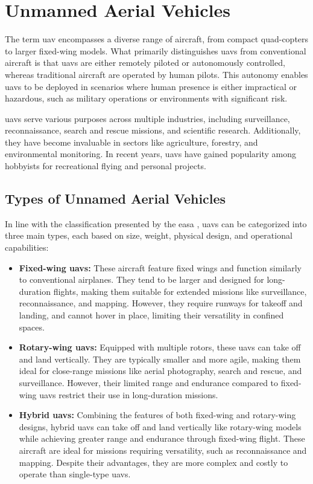 \chapter{Unmanned Aerial Vehicles}\label{ch:unmanned_aerial_vehicles}

The term \gls{uav} encompasses a diverse range of aircraft, from compact quad-copters to larger fixed-wing models. What primarily distinguishes \glspl{uav} from conventional aircraft is that \glspl{uav} are either remotely piloted or autonomously controlled, whereas traditional aircraft are operated by human pilots. This autonomy enables \glspl{uav} to be deployed in scenarios where human presence is either impractical or hazardous, such as military operations or environments with significant risk.

\glspl{uav} serve various purposes across multiple industries, including surveillance, reconnaissance, search and rescue missions, and scientific research. Additionally, they have become invaluable in sectors like agriculture, forestry, and environmental monitoring. In recent years, \glspl{uav} have gained popularity among hobbyists for recreational flying and personal projects.

\section{Types of Unnamed Aerial Vehicles}\label{sec:uav_types}

In line with the classification presented by the \gls{easa} \autocite{eu-947-2019}, \glspl{uav} can be categorized into three main types, each based on size, weight, physical design, and operational capabilities:

\begin{itemize}
  \item \textbf{Fixed-wing \glspl{uav}:} These aircraft feature fixed wings and function similarly to conventional airplanes. They tend to be larger and designed for long-duration flights, making them suitable for extended missions like surveillance, reconnaissance, and mapping. However, they require runways for takeoff and landing, and cannot hover in place, limiting their versatility in confined spaces.

  \item \textbf{Rotary-wing \glspl{uav}:} Equipped with multiple rotors, these \glspl{uav} can take off and land vertically. They are typically smaller and more agile, making them ideal for close-range missions like aerial photography, search and rescue, and surveillance. However, their limited range and endurance compared to fixed-wing \glspl{uav} restrict their use in long-duration missions.

  \item \textbf{Hybrid \glspl{uav}:} Combining the features of both fixed-wing and rotary-wing designs, hybrid \glspl{uav} can take off and land vertically like rotary-wing models while achieving greater range and endurance through fixed-wing flight. These aircraft are ideal for missions requiring versatility, such as reconnaissance and mapping. Despite their advantages, they are more complex and costly to operate than single-type \glspl{uav}.
\end{itemize}

